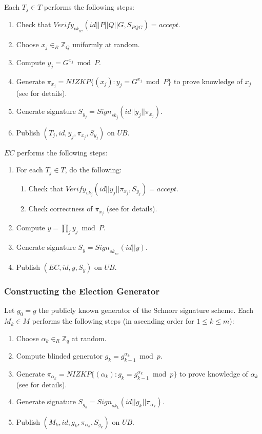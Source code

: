 \documentclass[bibtotoc,halfparskip,oneside]{scrreprt}
\newcommand{\eid}{\mathit{id}\xspace}
\newcommand{\sk}[1]{\mathit{sk}_{#1}\xspace}
\newcommand{\vk}[1]{\mathit{vk}_{#1}\xspace}
\newcommand{\SK}[1]{\sk{_#1}\xspace}
\newcommand{\VK}[1]{\vk{_#1}\xspace}
\newcommand{\EC}{\ensuremath{\mathit{EC}}\xspace}
\newcommand{\UB}{\ensuremath{\mathit{UB}}\xspace}
\newcommand{\Tallier}[1]{\ensuremath{\mathit{T}_{#1}}\xspace}
\newcommand{\Mixer}[1]{\ensuremath{\mathit{M}_{#1}}\xspace}
\begin{document}
Each $\Tallier{j}\in T$ performs the following steps:
\begin{enumerate}
	\item Check that $\mathit{Verify}_{\VK{\EC}}(\eid||P||Q||G,S_{\mathit{PQG}})=\mathit{accept}$.
	\item Choose $x_j\in_R\mathbb{Z}_Q$ uniformly at random.
	\item Compute $y_j = G^{x_j} \bmod{P}$.
	\item Generate $\pi_{x_j}=\mathit{NIZKP}\{(x_j):y_j=G^{x_j}\bmod{P}\}$ to prove knowledge of $x_j$ (see  for details).
	\item Generate signature $S_{y_j}=\mathit{Sign}_{\sk{j}}(\eid||y_j||\pi_{x_j})$.
	\item Publish $(\Tallier{j},\eid,y_j,\pi_{x_j},S_{y_j})$ on \UB.
\end{enumerate}

\EC performs the following steps:
\begin{enumerate}[resume]
	\item For each $\Tallier{j}\in T$, do the following:
	\begin{enumerate}
		\item Check that $\mathit{Verify}_{\vk{j}}(\eid||y_j||\pi_{x_j},S_{y_j})=\mathit{accept}$.
		\item Check correctness of $\pi_{x_j}$ (see  for details).
	\end{enumerate}
	\item Compute $y=\prod_j y_j\bmod{P}$.
	\item Generate signature $S_y=\mathit{Sign}_{\SK{\EC}}(\eid||y)$.
	\item Publish $(\EC,\eid,y,S_y)$ on \UB.
\end{enumerate}

\subsubsection{Constructing the Election Generator}

Let $g_0=g$ the publicly known generator of the Schnorr signature scheme. Each $\Mixer{k}\in M$ performs the following steps (in ascending order for $1\leq k\leq m$):
\begin{enumerate}
	\item Choose $\alpha_k\in_R\mathbb{Z}_q$ at random.
	\item Compute blinded generator $g_k = g_{k-1}^{\alpha_k}\bmod{p}$.
	\item Generate $\pi_{\alpha_k}=\mathit{NIZKP}\{(\alpha_k):g_k=g_{k-1}^{\alpha_k}\bmod{p}\}$ to prove knowledge of $\alpha_k$ (see  for details).
	\item Generate signature $S_{g_k}=\mathit{Sign}_{\sk{k}}(\eid||g_k||\pi_{\alpha_k})$.
	\item Publish $(\Mixer{k},\eid,g_k,\pi_{\alpha_k},S_{g_k})$ on \UB.
\end{enumerate}
\end{document}
